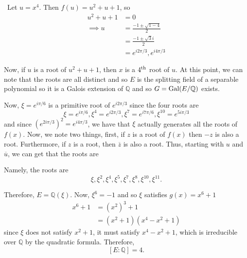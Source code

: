 \documentclass[12pt]{AlgebraQual}
\begin{document}
\begin{solution}$\,$
Let $u=x^4$. Then $f(u)=u^2+u+1$, so \begin{align*}
    u^2+u+1&=0\\
    \implies u&=\frac{-1\pm\sqrt{1-4}}{2}\\
    &=\frac{-1\pm\sqrt{3}i}{2}\\
    &=e^{i2\pi/3},e^{i4\pi/3}
\end{align*}

Now, if $u$ is a root of $u^2+u+1$, then $x$ is a $4^\text{th}$ root of $u$. At this point, we can note that the roots are all distinct and so $E$ is the splitting field of a separable polynomial so it is a Galois extension of $\mathbb{Q}$ and so $G=\text{Gal}(E/\mathbb{Q})$ exists.

Now, $\xi=e^{i\pi/6}$ is a primitive root of $e^{i2\pi/3}$ since the four roots are $$\xi=e^{i\pi/6},\xi^4=e^{i2\pi/3},\xi^7=e^{i7\pi/6},\xi^{10}=e^{5i\pi/3}$$ and since $(e^{2i\pi/3})^2=e^{i4\pi/3}$, we have that $\xi$ actually generates all the roots of $f(x)$. Now, we note two things, first, if $z$ is a root of $f(x)$ then $-z$ is also a root. Furthermore, if $z$ is a root, then $\overline{z}$ is also a root. Thus, starting with $u$ and $\overline{u}$, we can get that the roots are
\begin{center}
\end{center}

Namely, the roots are $$\xi,\xi^2,\xi^4,\xi^5,\xi^7,\xi^8,\xi^{10},\xi^{11}.$$

Therefore, $E=\mathbb{Q}(\xi)$. Now, $\xi^6=-1$ and so $\xi$ satisfies $g(x)=x^6+1$ \begin{align*}
    x^6+1&=(x^2)^3+1\\
    &=(x^2+1)(x^4-x^2+1)
\end{align*} since $\xi$ does not satisfy $x^2+1$, it must satisfy $x^4-x^2+1$, which is irreducible over $\mathbb{Q}$ by the quadratic formula.
Therefore, $$[E:\mathbb{Q}]=4.$$


\end{solution}
\end{document}
